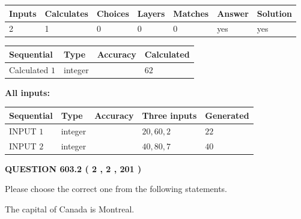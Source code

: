 \documentclass[12pt]{article}
\begin{document}
 

 
   
   
   
   
\noindent\begin{tabular}{|l|l|l|l|l|l|l|}
 \hline
Inputs & Calculates & Choices & Layers & Matches & Answer & Solution \\ \hline
 2  & 
 1  & 
 0
  & 
 0  & 
 0  & 
  yes & 
  yes 
  \\ \hline
 \end{tabular}
   
   
   
   
\noindent{}
   
   
  
  
\noindent\begin{tabular}{|l|l|l|l|}
\hline
 Sequential & Type & Accuracy & Calculated \\ 
\hline
 
 
  Calculated $  1 $ & integer &  & 
  $ 62 $ 
 \\  \hline  
 \end{tabular}
   
   
   
   
\noindent\vspace{0.1in}\hspace{-0.08in} {\textbf{\Large{All inputs: }}}
   
   
  
  
\noindent\begin{tabular}{|l|l|l|l|l|}
\hline
 Sequential & Type & Accuracy & Three inputs & Generated \\ 
\hline
 
 
  INPUT $  1 $ & integer &  & $
 20
 , 
 60
 , 
 2
 $ & $ 22 $ 
 \\  \hline  
 
 
  INPUT $  2 $ & integer &  & $
 40
 , 
 80
 , 
 7
 $ & $ 40 $ 
 \\  \hline  
 \end{tabular}
   
   
  
\vspace{0.2in}
  
{\textbf{\Large{QUESTION
603.2 
 ( 2 , 2 , 201 )
}}}
  
  
Please choose the correct one from the following statements.
 
 
The capital of Canada is Montreal.
 
\end{document}
